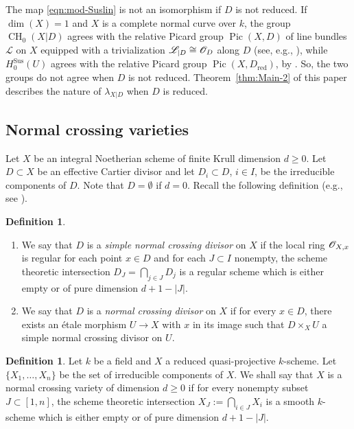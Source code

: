 \documentclass[11pt]{article}
\newcommand{\skpt}{\smallskip}
\numberwithin{equation}{section}
\let\mathcal\mathscr
\newcommand{\sus}{\mathrm{Sus}}
\theoremstyle{definition}
\newtheorem{defn}[thm]{Definition}
\newcommand{\thmref}{Theorem~\ref}
\DeclareMathOperator{\CH}{CH}
\DeclareMathOperator{\Pic}{Pic}
\newcommand{\red}{\mathrm{red}}
\begin{document}
The map \eqref{eqn:mod-Suslin} is not an isomorphism if $D$ is not reduced. If $\dim(X)=1$ and $X$ is a complete normal curve over $k$, the group $\CH_0(X|D)$ agrees with the relative Picard group $\Pic(X,D)$ of line bundles $\mathcal{L}$ on $X$ equipped with a trivialization $\mathcal{L}_{|D} \cong \cO_D$ along $D$ (see, e.g., \cite[\S 4]{BS}), while $H_0^{\sus}(U)$ agrees with the relative Picard group $\Pic(X, D_{\red})$, by \cite[Th.\,7.16]{MVW}. So, the two groups do not agree when $D$ is not reduced.
\thmref{thm:Main-2} of this paper describes the nature of
$\lambda_{X|D}$ when $D$ is reduced.

\subsection{Normal crossing varieties} Let $X$ be an integral
Noetherian scheme of finite Krull dimension $d\!\ge\!0$.
Let $D\!\subset\!X$ be an effective Cartier divisor and
let $D_i\!\subset\!D$, $i\!\in\!I$, be the irreducible components of $D$.
Note that $D = \emptyset$ if $d = 0$. Recall the following definition
(e.g., see \cite[2.4]{deJong}).

\skpt
\begin{defn}\label{defn:ncs}
\begin{enumerate}
\item
We say that $D$ is a \emph{simple normal crossing divisor} on $X$
if the local ring $\cO_{X,x}$ is regular for each point $x\in D$ and for
each $J \subset I$ nonempty, the scheme theoretic intersection
$D_J = \bigcap_{j\in J} D_j$ is a regular scheme which is either empty or
of pure dimension $d+1-|J|$.

\item
We say that $D$ is a \emph{normal crossing divisor} on $X$ if for every
$x \in D$, there exists an étale morphism $U \to X$ with $x$ in its image
such that $D \times_X U$ a simple normal crossing divisor on $U$.
\end{enumerate}
\end{defn}

\begin{defn}\label{defn:ncg}
Let $k$ be a field and $X$ a reduced quasi-projective $k$-scheme.
Let $\{X_1, \ldots , X_n\}$ be the set of irreducible components of $X$. We
shall say that $X$ is a normal crossing variety of dimension $d \ge 0$
if for every nonempty subset $J \subset [1, n]$, the scheme theoretic
intersection $X_J := \bigcap_{i \in J} X_i$ is a smooth $k$-scheme
which is either empty or of pure dimension $d + 1 - |J|$.
\end{defn}
\end{document}
